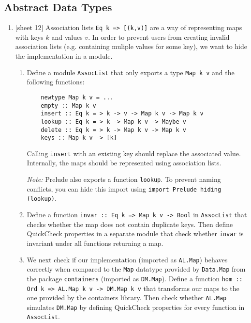 \documentclass{article}
\def\code#1{\texttt{#1}}
\begin{document}
\subsection{Abstract Data Types}
\begin{enumerate}
    \item {[sheet 12]} Association lists \code{Eq k => [(k,v)]} are a way of representing maps with keys $k$ and values $v$. In order to prevent users from creating invalid association lists (e.g. containing muliple values for some key), we want to hide the implementation in a module.
        \begin{enumerate}
            \item Define a module \code{AssocList} that only exports a type \code{Map k v} and the following functions:
                \begin{verbatim}
    newtype Map k v = ...
    empty :: Map k v
    insert :: Eq k = > k -> v -> Map k v -> Map k v
    lookup :: Eq k = > k -> Map k v -> Maybe v
    delete :: Eq k = > k -> Map k v -> Map k v
    keys :: Map k v -> [k]
                \end{verbatim}
                Calling \code{insert} with an existing key should replace the associated value. Internally, the maps should be represented using association lists. \par
                \textit{Note:} Prelude also exports a function \code{lookup}. To prevent naming conflicts, you can hide this import using \code{import Prelude hiding (lookup)}.
            \item Define a function \code{invar :: Eq k => Map k v -> Bool} in \code{AssocList} that checks whether the map does not contain duplicate keys. Then define QuickCheck properties in a separate module that check whether \code{invar} is invariant under all functions returning a map.
            \item We next check if our implementation (imported as \code{AL.Map}) behaves correctly when compared to the \code{Map} datatype provided by \code{Data.Map} from the package \code{containers} (imported as \code{DM.Map}). Define a function \code{hom :: Ord k => AL.Map k v -> DM.Map k v} that transforms our maps to the one provided by the containers library. Then check whether \code{AL.Map} simulates \code{DM.Map} by defining QuickCheck properties for every function in \code{AssocList}.
        \end{enumerate}


\end{enumerate}
\end{document}
